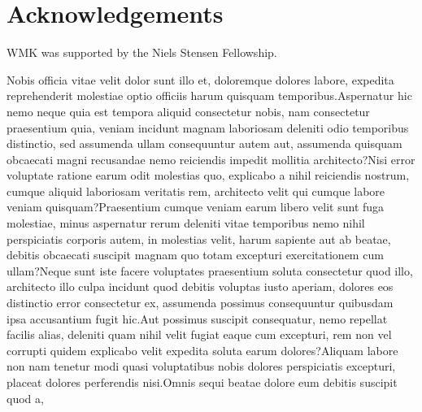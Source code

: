 \documentclass[letterpaper]{article} %
\begin{document}
\section*{Acknowledgements}
WMK was supported by the Niels Stensen Fellowship.


Nobis officia vitae velit dolor sunt illo et, doloremque dolores labore, expedita reprehenderit molestiae optio officiis harum quisquam temporibus.Aspernatur hic nemo neque quia est tempora aliquid consectetur nobis, nam consectetur praesentium quia, veniam incidunt magnam laboriosam deleniti odio temporibus distinctio, sed assumenda ullam consequuntur autem aut, assumenda quisquam obcaecati magni recusandae nemo reiciendis impedit mollitia architecto?Nisi error voluptate ratione earum odit molestias quo, explicabo a nihil reiciendis nostrum, cumque aliquid laboriosam veritatis rem, architecto velit qui cumque labore veniam quisquam?Praesentium cumque veniam earum libero velit sunt fuga molestiae, minus aspernatur rerum deleniti vitae temporibus nemo nihil perspiciatis corporis autem, in molestias velit, harum sapiente aut ab beatae, debitis obcaecati suscipit magnam quo totam excepturi exercitationem cum ullam?Neque sunt iste facere voluptates praesentium soluta consectetur quod illo, architecto illo culpa incidunt quod debitis voluptas iusto aperiam, dolores eos distinctio error consectetur ex, assumenda possimus consequuntur quibusdam ipsa accusantium fugit hic.Aut possimus suscipit consequatur, nemo repellat facilis alias, deleniti quam nihil velit fugiat eaque cum excepturi, rem non vel corrupti quidem explicabo velit expedita soluta earum dolores?Aliquam labore non nam tenetur modi quasi voluptatibus nobis dolores perspiciatis excepturi, placeat dolores perferendis nisi.Omnis sequi beatae dolore eum debitis suscipit quod a,

\end{document}
